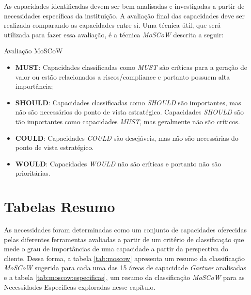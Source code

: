 As capacidades identificadas devem ser bem analisadas e investigadas a partir de necessidades específicas da instituição. A avaliação final das capacidades deve ser realizada comparando as capacidades entre sí. Uma técnica útil, que será utilizada para fazer essa avaliação, é a técnica \emph{MoSCoW} descrita a seguir:


\begin{env-destaque}{Avaliação MoSCoW}
    \begin{itemize}
        \item \textbf{MUST}: Capacidades classificadas como \emph{MUST} são críticas para a geração de valor ou estão relacionados a riscos/compliance e portanto possuem alta importância;
        
        \item \textbf{SHOULD}: Capacidades classificadas como \emph{SHOULD} são importantes, mas não são necessários do ponto de vista estratégico. Capacidades \emph{SHOULD} são tão importantes como capacidades \emph{MUST}, mas geralmente não são críticos. 
                
        \item \textbf{COULD}: Capacidades \emph{COULD} são desejáveis, mas não são necessárias do ponto de vista estratégico. 
        
        \item \textbf{WOULD}: \nohyphens{Capacidades \emph{WOULD} não são críticas e portanto não são prioritárias.}
    \end{itemize}
\end{env-destaque}







\section{Tabelas Resumo}

As necessidades foram determinadas como um conjunto de capacidades oferecidas pelas diferentes ferramentas avaliadas a partir de um critério de classificação que mede o grau de importâncias de uma capacidade a partir da perspectiva do cliente. Dessa forma, a tabela \ref{tab:moscow} apresenta um resumo da classificação \emph{MoSCoW} sugerida para cada uma das 15 áreas de capacidade \emph{Gartner} analisadas e a tabela \ref{tab:moscow:especificas}, um resumo da classificação \emph{MoSCoW} para as Necessidades Específicas exploradas nesse capítulo.

